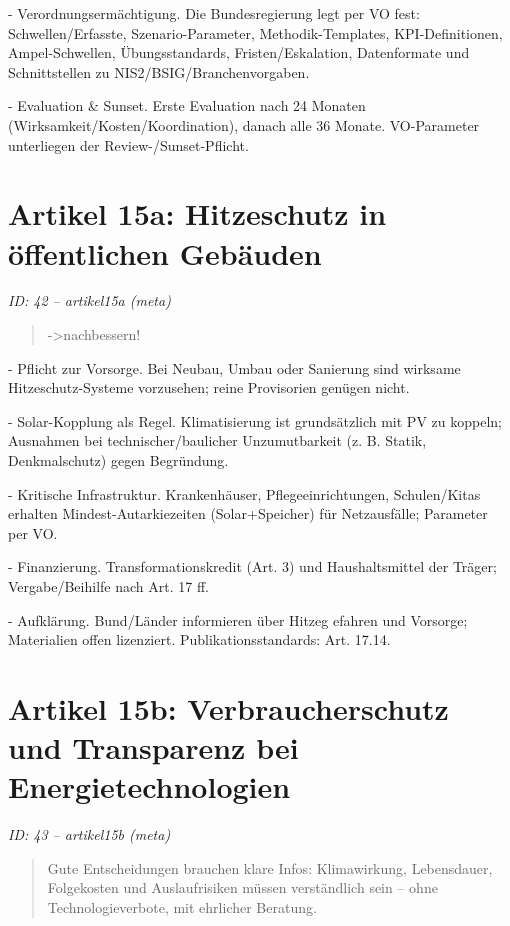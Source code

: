 \documentclass[12pt,a4paper]{scrartcl}
\begin{document}
- Verordnungsermächtigung. Die Bundesregierung legt per VO fest: Schwellen/Erfasste, Szenario-Parameter, Methodik-Templates, KPI-Definitionen, Ampel-Schwellen, Übungsstandards, Fristen/Eskalation, Datenformate und Schnittstellen zu NIS2/BSIG/Branchenvorgaben.

- Evaluation \& Sunset. Erste Evaluation nach 24 Monaten (Wirksamkeit/Kosten/Koordination), danach alle 36 Monate. VO-Parameter unterliegen der Review-/Sunset-Pflicht.


\section[Artikel 15a: Hitzeschutz in öffentlichen Gebäuden]{Artikel 15a: Hitzeschutz in öffentlichen Gebäuden}
\noindent\textit{ID: 42 -- artikel15a (meta)}

\begin{quote}
->nachbessern!
\end{quote}

- Pflicht zur Vorsorge. Bei Neubau, Umbau oder Sanierung sind wirksame Hitzeschutz-Systeme vorzusehen; reine Provisorien genügen nicht.

- Solar-Kopplung als Regel. Klimatisierung ist grundsätzlich mit PV zu koppeln; Ausnahmen bei technischer/baulicher Unzumutbarkeit (z. B. Statik, Denkmalschutz) gegen Begründung.

- Kritische Infrastruktur. Krankenhäuser, Pflegeeinrichtungen, Schulen/Kitas erhalten Mindest-Autarkiezeiten (Solar+Speicher) für Netzausfälle; Parameter per VO.

- Finanzierung. Transformationskredit (Art. 3) und Haushaltsmittel der Träger; Vergabe/Beihilfe nach Art. 17 ff.

- Aufklärung. Bund/Länder informieren über Hitzeg efahren und Vorsorge; Materialien offen lizenziert. Publikationsstandards: Art. 17.14.


\section[Artikel 15b: Verbraucherschutz und Transparenz bei Energietechnologien]{Artikel 15b: Verbraucherschutz und Transparenz bei Energietechnologien}
\noindent\textit{ID: 43 -- artikel15b (meta)}

\begin{quote}
Gute Entscheidungen brauchen klare Infos: Klimawirkung, Lebensdauer, Folgekosten und Auslaufrisiken müssen verständlich sein -- ohne Technologieverbote, mit ehrlicher Beratung.
\end{quote}
\end{document}
